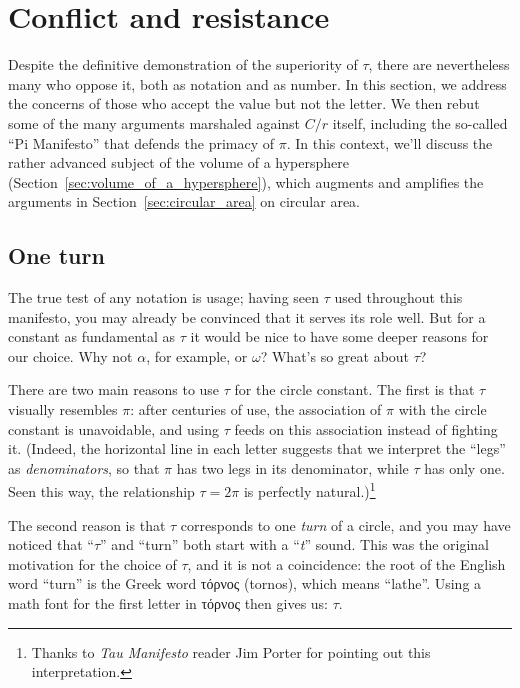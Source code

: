 

\section{Conflict and resistance} %
\label{sec:conflict_and_resistance}

Despite the definitive demonstration of the superiority of $\tau$, there are nevertheless many who oppose it, both as notation and as number. In this section, we address the concerns of those who accept the value but not the letter. We then rebut some of the many arguments marshaled against $C/r$ itself, including the so-called ``Pi Manifesto'' that defends the primacy of $\pi$. In this context, we'll discuss the rather advanced subject of the volume of a hypersphere (Section~\ref{sec:volume_of_a_hypersphere}), which augments and amplifies the arguments in Section~\ref{sec:circular_area} on circular area.

  \subsection{One turn} %
  \label{sec:one_turn}

The true test of any notation is usage; having seen $\tau$ used throughout this manifesto, you may already be convinced that it serves its role well. But for a constant as fundamental as $\tau$ it would be nice to have some deeper reasons for our choice. Why not $\alpha$, for example, or $\omega$? What's so great about $\tau$?

There are two main reasons to use $\tau$ for the circle constant. The first is that $\tau$ visually resembles $\pi$: after centuries of use, the association of $\pi$ with the circle constant is unavoidable, and using $\tau$ feeds on this association instead of fighting it. (Indeed, the horizontal line in each letter suggests that we interpret the ``legs'' as \emph{denominators}, so that $\pi$ has two legs in its denominator, while $\tau$ has only one. Seen this way, the relationship $\tau = 2\pi$ is perfectly natural.)\footnote{Thanks to \emph{Tau Manifesto} reader Jim Porter for pointing out this interpretation.}

The second reason is that $\tau$ corresponds to one \emph{turn} of a circle, and you may have noticed that ``$\tau$'' and ``turn'' both start with a ``\emph{t}'' sound. This was the original motivation for the choice of $\tau$, and it is not a coincidence: the root of the English word ``turn'' is the Greek word τόρνος (tornos), which means ``lathe''. Using a math font for the first letter in τόρνος then gives us: $\tau$.


